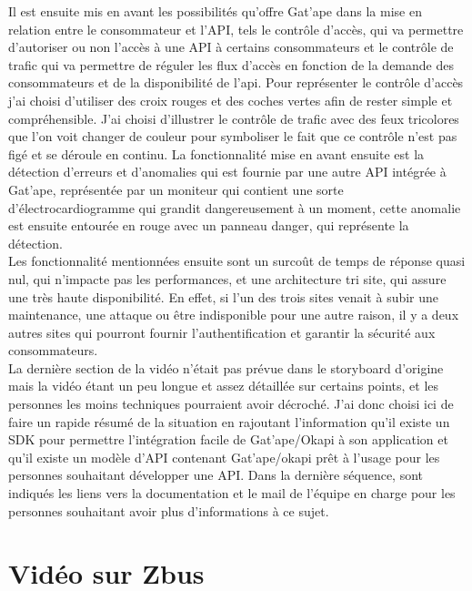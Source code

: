 Il est ensuite mis en avant les possibilités qu'offre Gat'ape dans la mise en relation entre le consommateur et l'API, tels le contrôle d'accès, qui va permettre d'autoriser ou non l'accès à une API à certains consommateurs et le contrôle de trafic qui va permettre de réguler les flux d'accès en fonction de la demande des consommateurs et de la disponibilité de l'api. Pour représenter le contrôle d'accès j'ai choisi d'utiliser des croix rouges et des coches vertes afin de rester simple et compréhensible. J'ai choisi d'illustrer le contrôle de trafic avec des feux tricolores que l'on voit changer de couleur pour symboliser le fait que ce contrôle n'est pas figé et se déroule en continu. La fonctionnalité mise en avant ensuite est la détection d'erreurs et d'anomalies qui est fournie par une autre API intégrée à Gat'ape, représentée par un moniteur qui contient une sorte d'électrocardiogramme qui grandit dangereusement à un moment, cette anomalie est ensuite entourée en rouge avec un panneau danger, qui représente la détection.\\

Les fonctionnalité mentionnées ensuite sont un surcoût de temps de réponse quasi nul, qui n'impacte pas les performances, et une architecture tri site, qui assure  une très haute disponibilité. En effet, si l'un des trois sites venait à subir une maintenance, une attaque ou être indisponible pour une autre raison, il y a deux autres sites qui pourront fournir l'authentification et garantir la sécurité aux consommateurs.\\

La dernière section de la vidéo n'était pas prévue dans le storyboard d'origine mais la vidéo étant un peu longue et assez détaillée sur certains points, et les personnes les moins techniques pourraient avoir décroché. J'ai donc choisi ici de faire un rapide résumé de la situation en rajoutant l'information qu'il existe un SDK pour permettre l'intégration facile de Gat'ape/Okapi à son application et qu'il existe un modèle d'API contenant Gat'ape/okapi prêt à l'usage pour les personnes souhaitant développer une API. Dans la dernière séquence, sont indiqués les liens vers la documentation et le mail de l'équipe en charge pour les personnes souhaitant avoir plus d'informations à ce sujet. 



\section{Vidéo sur Zbus}

